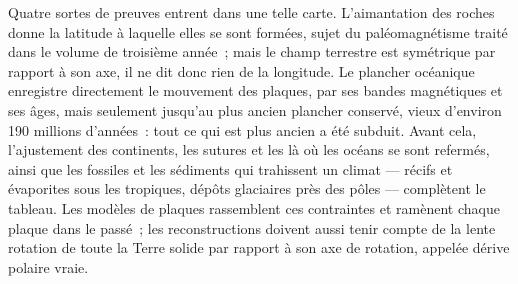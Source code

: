 Quatre sortes de preuves entrent dans une telle carte. L'aimantation des roches donne la latitude à laquelle
elles se sont formées, sujet du paléomagnétisme traité dans le volume de troisième année~; mais le champ
terrestre est symétrique par rapport à son axe, il ne dit donc rien de la longitude. Le plancher océanique
enregistre directement le mouvement des plaques, par ses bandes magnétiques et ses âges, mais seulement jusqu'au
plus ancien plancher conservé, vieux d'environ 190 millions d'années~: tout ce qui est plus ancien a
été subduit. Avant cela, l'ajustement des continents, les sutures et les  là où les océans se sont
refermés, ainsi que les fossiles et les sédiments qui trahissent un climat --- récifs et évaporites sous les
tropiques, dépôts glaciaires près des pôles --- complètent le tableau. Les modèles de plaques rassemblent
ces contraintes et ramènent chaque plaque dans le passé~; les reconstructions doivent aussi tenir compte de
la lente rotation de toute la Terre solide par rapport à son axe de rotation, appelée dérive polaire vraie.

